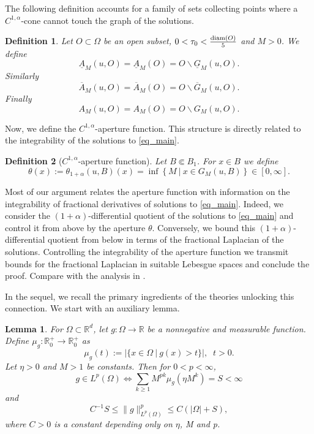 \documentclass[10pt]{article} %
\newtheorem{Definition}{Definition}
\newtheorem{Lemma}{Lemma}
\def \suchthat {\ \big | \ }
\begin{document}
The following definition accounts for a family of sets collecting points where a $ C ^{1,\alpha}$-cone cannot touch the graph of the solutions.

\begin{Definition}
Let $O \subset \Omega$ be an open subset, $0<\tau_0<\frac{{\rm diam}(O)}{5}$ and $M > 0$. We define
\[
\underline{A}_M(u,O) = \underline{A}_M(O) = O\backslash \underline{G}_M(u,O). 
\]
Similarly 
\[
\overline{A}_M(u,O) = \overline{A}_M(O) = O\backslash \overline{G}_M(u,O).
\]
Finally
\[
A_M(u,O) = A_M(O) = O\backslash G_M(u,O).
\]
\end{Definition}

Now, we define the $ C ^{1,\alpha}$-aperture function. This structure is directly related to the integrability of the solutions to \eqref{eq_main}.

\begin{Definition}[$ C ^{1,\alpha}$-aperture function]\label{def_aperture}
Let $B\Subset B_1$. For $x \in B$ we define
\[
	\theta(x) := \theta_{1+\alpha}(u,B)(x) = \inf \left\lbrace M \suchthat x\in G_M(u,B) \right\rbrace\in [0, \infty].
\]
\end{Definition} 

Most of our argument relates the aperture function with information on the integrability of fractional derivatives of solutions to \eqref{eq_main}. Indeed, we consider the $(1+\alpha)$-differential quotient of the solutions to \eqref{eq_main} and control it from above by the aperture $\theta$. Conversely, we bound this $(1+\alpha)$-differential quotient from below in terms of the fractional Laplacian of the solutions. Controlling the integrability of the aperture function we transmit bounds for the fractional Laplacian in suitable Lebesgue spaces and conclude the proof. Compare with the analysis in \cite[Proposition 1.1]{cafcab}.

In the sequel, we recall the primary ingredients of the theories unlocking this connection. We start with an auxiliary lemma.

\begin{Lemma}\label{lem_reg}
For $\Omega\subset\mathbb{R}^d$, let $g:\Omega\to\mathbb{R}$ be a nonnegative and measurable function. Define $\mu_g:\mathbb{R}^+_0\to\mathbb{R}^+_0$ as
\[
\mu_g(t) := |\{x\in\Omega ~ | ~ g(x) >t\}|, \;\; t>0.
\] 
Let $\eta>0$ and $M>1$ be constants. Then for $0<p<\infty$,
\[
g\in L^p(\Omega) \Longleftrightarrow \sum_{k\geq 1}M^{pk}\mu_g(\eta M^k) = S < \infty
\]
and
\[
C^{-1}S\leq \|g\|^p_{L^p(\Omega)}\leq C(|\Omega| + S),
\]
where $C>0$ is a constant depending only on $\eta$, M and p.
\end{Lemma}
\end{document}
